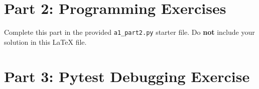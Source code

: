 \documentclass[12pt]{article}
\begin{document}
\section*{Part 2: Programming Exercises}

Complete this part in the provided \texttt{a1\_part2.py} starter file.
Do \textbf{not} include your solution in this LaTeX file.

\section*{Part 3: Pytest Debugging Exercise}

\end{document}
